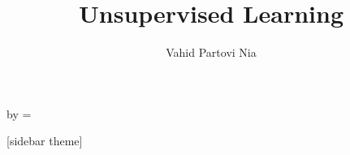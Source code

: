 

\usepackage{listings}
\usepackage{xcolor}
\def \y {\mathbf y}
\def \z {\mathbf z}
\def \Z {\mathbf Z}
\def \X {\mathbf X}
\def \A {\mathbf A}
\def \t {^\top}
\def \inv {^ {-1}}
\def \x {\mathbf x}
\def \bbeta {\boldsymbol \beta}
\def \eeps {\boldsymbol \varepsilon}
\def \TV {\mathrm{TV}}
\def \Radio {\mathrm{Radio}}
\def \Newspaper {\mathrm{Newspaper}}
\def \Sales {\mathrm{Sales}}
\def \Balance {\mathrm{Balance}}
\def \Default {\mathrm{Default}}
\def \M {\mathcal{M}}

\def \r {\mathbf{r}}
\def \e {\mathbf{e}}

\def \RSS {\mathrm{RSS}}

\def \E {\mathrm{E}}
\def \P {\mathbf{P}}

\def \V {\mathrm{V}}
\def \cor {\mathrm{cor}}

\def \SSigma {\boldsymbol{\Sigma}}
\def \LLambda {\boldsymbol{\Lambda}}
\def \pphi {\boldsymbol{\phi}}
\def \PPhi {\boldsymbol{\Phi}}
\def \mmu {\boldsymbol{\mu}}
\def \ttheta {\boldsymbol{\theta}}

\def \dvec {\mathbf c}
\def \ybar {\bar{y}}
\def \muvec {\boldsymbol \mu}





\title[]{Unsupervised Learning}   
\author[]{Vahid Partovi Nia} 
\date{}


\makeatletter
  \begin{frame}[plain]
    \hspace*{-\beamer@leftsidebar}%
    \advance\textwidth by \beamer@leftsidebar\relax
    \beamer@leftsidebar=\z@
    \begin{minipage}{\textwidth}\par%
      \maketitle
    \end{minipage}
  \end{frame}
  \makeatother




[sidebar theme]


